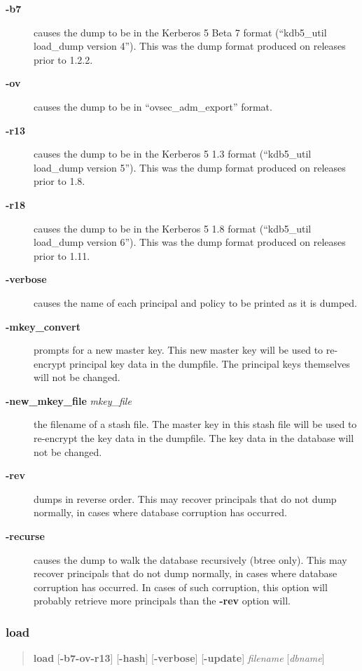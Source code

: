 \documentclass[letterpaper,10pt,english]{sphinxmanual}
\begin{document}
\begin{description}
\item[{\textbf{-b7}}] \leavevmode
causes the dump to be in the Kerberos 5 Beta 7 format (``kdb5\_util
load\_dump version 4'').  This was the dump format produced on
releases prior to 1.2.2.

\item[{\textbf{-ov}}] \leavevmode
causes the dump to be in ``ovsec\_adm\_export'' format.

\item[{\textbf{-r13}}] \leavevmode
causes the dump to be in the Kerberos 5 1.3 format (``kdb5\_util
load\_dump version 5'').  This was the dump format produced on
releases prior to 1.8.

\item[{\textbf{-r18}}] \leavevmode
causes the dump to be in the Kerberos 5 1.8 format (``kdb5\_util
load\_dump version 6'').  This was the dump format produced on
releases prior to 1.11.

\item[{\textbf{-verbose}}] \leavevmode
causes the name of each principal and policy to be printed as it
is dumped.

\item[{\textbf{-mkey\_convert}}] \leavevmode
prompts for a new master key.  This new master key will be used to
re-encrypt principal key data in the dumpfile.  The principal keys
themselves will not be changed.

\item[{\textbf{-new\_mkey\_file} \emph{mkey\_file}}] \leavevmode
the filename of a stash file.  The master key in this stash file
will be used to re-encrypt the key data in the dumpfile.  The key
data in the database will not be changed.

\item[{\textbf{-rev}}] \leavevmode
dumps in reverse order.  This may recover principals that do not
dump normally, in cases where database corruption has occurred.

\item[{\textbf{-recurse}}] \leavevmode
causes the dump to walk the database recursively (btree only).
This may recover principals that do not dump normally, in cases
where database corruption has occurred.  In cases of such
corruption, this option will probably retrieve more principals
than the \textbf{-rev} option will.

\end{description}


\subsubsection{load}
\label{admin/admin_commands/kdb5_util:kdb5-util-dump-end}\label{admin/admin_commands/kdb5_util:load}\label{admin/admin_commands/kdb5_util:kdb5-util-load}\begin{quote}

\textbf{load} {[}\textbf{-b7}\textbar{}\textbf{-ov}\textbar{}\textbf{-r13}{]} {[}\textbf{-hash}{]}
{[}\textbf{-verbose}{]} {[}\textbf{-update}{]} \emph{filename} {[}\emph{dbname}{]}
\end{quote}
\end{document}
